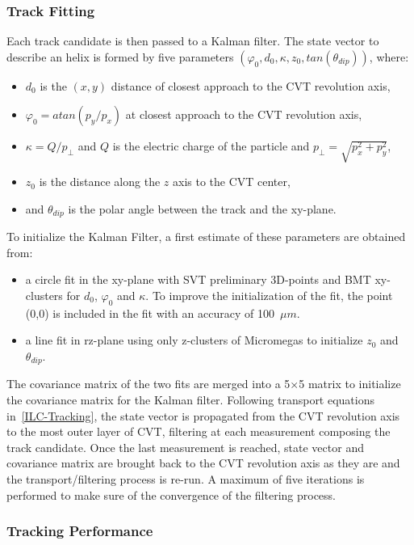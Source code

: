 \subsubsection{Track Fitting}

Each track candidate is then passed to a Kalman filter. The state vector to describe an helix is formed by five
parameters $(\varphi_0, d_0, \kappa, z_0, tan(\theta_{dip}))$, where:
\begin{itemize}
\item $d_0$ is the $(x,y)$ distance of closest approach to the CVT revolution axis,
\item $\varphi_0 = atan(p_y/p_x)$ at closest approach to the CVT revolution axis,
\item $\kappa=Q/p_\perp$ and $Q$ is the electric charge of the particle and $p_\perp=\sqrt{p_x^2+p_y^2}$,
\item $z_0$ is the distance along the $z$ axis to the CVT center,
\item and $\theta_{dip}$ is the polar angle between the track and the xy-plane.
\end{itemize}

To initialize the Kalman Filter, a first estimate of these parameters are obtained from:
\begin{itemize}
\item a circle fit in the xy-plane with SVT preliminary 3D-points and BMT xy-clusters for $d_0$, $\varphi_0$ and
$\kappa$. To improve the initialization of the fit, the point (0,0) is included in the fit with an accuracy of 100~$\mu
m$.
\item a line fit in rz-plane using only z-clusters of Micromegas to initialize $z_0$ and $\theta_{dip}$.
\end{itemize}
The covariance matrix of the two fits are merged into a 5$\times$5 matrix to initialize the covariance matrix for the
Kalman filter. Following transport equations in~\ref{ILC-Tracking}, the state vector is propagated from the CVT
revolution axis to the most outer layer of CVT, filtering at each measurement composing the track candidate. Once the
last measurement is reached, state vector and covariance matrix are brought back to the CVT revolution axis as they are
and the transport/filtering process is re-run. A maximum of five iterations is performed to make sure of the
convergence of the filtering process.

\subsubsection{Tracking Performance}

